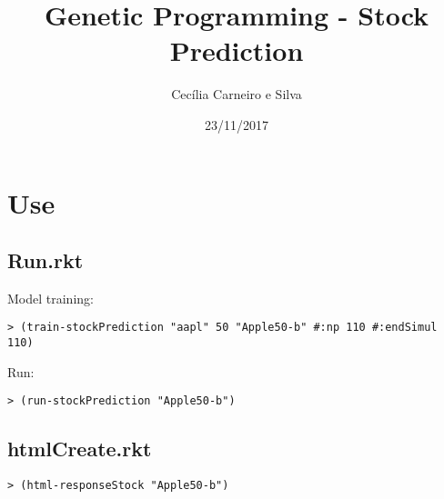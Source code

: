 \documentclass[11pt]{article}
\author{Cecília Carneiro e Silva}
\date{23/11/2017}
\title{Genetic Programming - Stock Prediction}
\begin{document}
\maketitle
\tableofcontents


\section{Use}
\label{sec-1}

\subsection{Run.rkt}
\label{sec-1-1}

Model training:

\begin{verbatim}
> (train-stockPrediction "aapl" 50 "Apple50-b" #:np 110 #:endSimul 110)
\end{verbatim}

Run:

\begin{verbatim}
> (run-stockPrediction "Apple50-b")
\end{verbatim}

\subsection{htmlCreate.rkt}
\label{sec-1-2}

\begin{verbatim}
> (html-responseStock "Apple50-b")
\end{verbatim}
\end{document}
